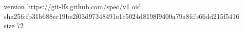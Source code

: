 version https://git-lfs.github.com/spec/v1
oid sha256:fb31b688ec19be2f03d97348491e1c5024d8198f9400a79a8fdb66dd215f5416
size 72
